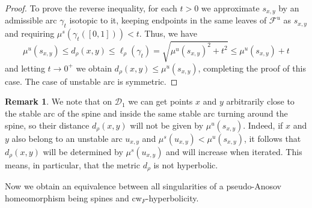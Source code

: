 \documentclass{amsart}
\theoremstyle{plain}
\theoremstyle{definition}
\newtheorem{remark}[theorem]{Remark}
\newcommand{\mc}{\mathcal}
\begin{document}
\begin{proof}
To prove the reverse inequality, for each $t>0$
we approximate $s_{x,y}$ by an admissible arc $\gamma_t$ isotopic to it, keeping endpoints in the same leaves of $\mc{F}^u$ as $s_{x,y}$ and requiring $\mu^s(\gamma_t([0,1]))<t$.
Thus, we have 
$$
\mu^u(s_{x,y})\leq d_\rho(x,y)\leq \ell_{\rho}(\gamma_t)=\sqrt{\mu^u(s_{x,y})^2+t^2}\leq \mu^u(s_{x,y})+t
$$
and letting $t\to0^+$ we obtain $d_\rho(x,y)\leq\mu^u(s_{x,y})$, completing the proof of this case. The case of unstable arc is symmetric.
\end{proof}

 \begin{remark}
We note that on $\mc{D}_1$ we can get points $x$ and $y$ arbitrarily close to the stable arc of the spine and inside the same stable arc turning around the spine, so their distance $d_{\rho}(x,y)$ will not be given by $\mu^u(s_{x,y})$. Indeed, if $x$ and $y$ also belong to an unstable arc $u_{x,y}$ and $\mu^s(u_{x,y})<\mu^u(s_{x,y})$, it follows that $d_{\rho}(x,y)$ will be determined by $\mu^s(u_{x,y})$ and will increase when iterated. This means, in particular, that the metric $d_{\rho}$ is not hyperbolic. 
\end{remark}

Now we obtain an equivalence between all singularities of a pseudo-Anosov homeomorphism being spines and cw$_F$-hyperbolicity.
\end{document}
